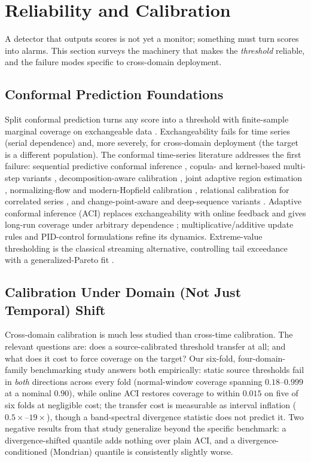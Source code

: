 \section{Reliability and Calibration}
\label{sec:calibration}

A detector that outputs scores is not yet a monitor; something must turn scores into alarms. This section surveys the machinery that makes the \emph{threshold} reliable, and the failure modes specific to cross-domain deployment.

\subsection{Conformal Prediction Foundations}
Split conformal prediction turns any score into a threshold with finite-sample marginal coverage on exchangeable data \cite{lei2018}. Exchangeability fails for time series (serial dependence) and, more severely, for cross-domain deployment (the target is a different population). The conformal time-series literature addresses the first failure: sequential predictive conformal inference \cite{2212_03463}, copula- and kernel-based multi-step variants \cite{2212_03281,2405_16828}, decomposition-aware calibration \cite{2406_16766}, joint adaptive region estimation \cite{2407_06390}, normalizing-flow and modern-Hopfield calibration \cite{2502_05709,2303_12783}, relational calibration for correlated series \cite{2502_09443}, and change-point-aware and deep-sequence variants \cite{2509_02844,2610_02357,2609_33868}. Adaptive conformal inference (ACI) replaces exchangeability with online feedback and gives long-run coverage under arbitrary dependence \cite{aci2021}; multiplicative/additive update rules \cite{dtaci2022} and PID-control formulations \cite{conformalpid2023} refine its dynamics. Extreme-value thresholding is the classical streaming alternative, controlling tail exceedance with a generalized-Pareto fit \cite{siffer2017}.

\subsection{Calibration Under Domain (Not Just Temporal) Shift}
Cross-domain calibration is much less studied than cross-time calibration. The relevant questions are: does a source-calibrated threshold transfer at all; and what does it cost to force coverage on the target? Our six-fold, four-domain-family benchmarking study \cite{our_scc} answers both empirically: static source thresholds fail in \emph{both} directions across every fold (normal-window coverage spanning $0.18$--$0.999$ at a nominal $0.90$), while online ACI restores coverage to within $0.015$ on five of six folds at negligible cost; the transfer cost is measurable as interval inflation ($0.5\times$--$19\times$), though a band-spectral divergence statistic does not predict it. Two negative results from that study generalize beyond the specific benchmark: a divergence-shifted quantile adds nothing over plain ACI, and a divergence-conditioned (Mondrian) quantile is consistently slightly worse.

